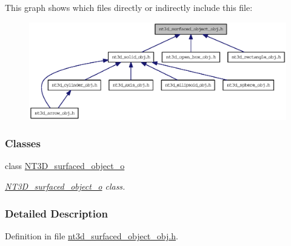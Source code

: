 This graph shows which files directly or indirectly include this file:
\nopagebreak
\begin{figure}[H]
\begin{center}
\leavevmode
\includegraphics[width=400pt]{nt3d__surfaced__object__obj_8h__dep__incl}
\end{center}
\end{figure}
\subsubsection*{Classes}
\begin{DoxyCompactItemize}
\item 
class \hyperlink{class_n_t3_d__surfaced__object__o}{NT3D\_\-surfaced\_\-object\_\-o}
\begin{DoxyCompactList}\small\item\em \hyperlink{class_n_t3_d__surfaced__object__o}{NT3D\_\-surfaced\_\-object\_\-o} class. \item\end{DoxyCompactList}\end{DoxyCompactItemize}


\subsubsection{Detailed Description}


Definition in file \hyperlink{nt3d__surfaced__object__obj_8h_source}{nt3d\_\-surfaced\_\-object\_\-obj.h}.

